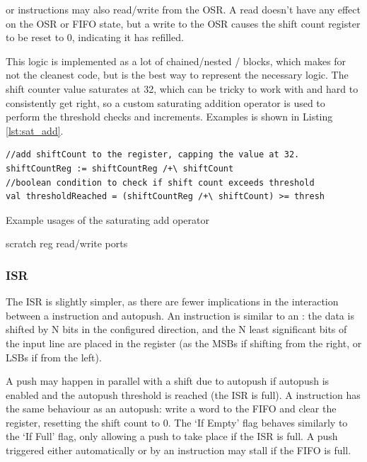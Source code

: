  or  instructions may also read/write from the OSR. A read doesn't have any effect on the OSR or FIFO state, but a write to the OSR causes the shift count register to be reset to 0, indicating it has refilled.

This logic is implemented as a lot of chained/nested / blocks, which makes for not the cleanest code, but is the best way to represent the necessary logic. The shift counter value saturates at 32, which can be tricky to work with and hard to consistently get right, so a custom saturating addition operator \txt{+!} is used to perform the threshold checks and increments. Examples is shown in Listing \ref{lst:sat_add}.


\begin{listing}[h!]
    \vspace{0.5cm}
    \begin{verbatim}
//add shiftCount to the register, capping the value at 32.
shiftCountReg := shiftCountReg /+\ shiftCount
//boolean condition to check if shift count exceeds threshold
val thresholdReached = (shiftCountReg /+\ shiftCount) >= thresh
    \end{verbatim}
    \caption{Example usages of the saturating add operator}
    \label{lst:sat_add}
\end{listing}


scratch reg
read/write ports

\subsubsection{ISR}

The ISR is slightly simpler, as there are fewer implications in the interaction between a  instruction and autopush. An  instruction is similar to an : the data is shifted by N bits in the configured direction, and the N least significant bits of the input line are placed in the register (as the MSBs if shifting from the right, or LSBs if from the left).

A push may happen in parallel with a shift due to autopush if autopush is enabled and the autopush threshold is reached (the ISR is full). A  instruction has the same behaviour as an autopush: write a word to the FIFO and clear the register, resetting the shift count to 0. The `If Empty' flag behaves similarly to the `If Full' flag, only allowing a push to take place if the ISR is full. A push triggered either automatically or by an instruction may stall if the FIFO is full.

